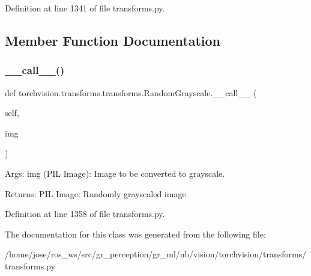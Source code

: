 Definition at line 1341 of file transforms.\+py.



\subsection{Member Function Documentation}
\mbox{\label{classtorchvision_1_1transforms_1_1transforms_1_1RandomGrayscale_aa02b86308d282e359f0cfb294fbb53ba}} 
\subsubsection{\texorpdfstring{\+\_\+\+\_\+call\+\_\+\+\_\+()}{\_\_call\_\_()}}
{\footnotesize\ttfamily def torchvision.\+transforms.\+transforms.\+Random\+Grayscale.\+\_\+\+\_\+call\+\_\+\+\_\+ (\begin{DoxyParamCaption}\item[{}]{self,  }\item[{}]{img }\end{DoxyParamCaption})}

\begin{DoxyVerb}Args:
    img (PIL Image): Image to be converted to grayscale.

Returns:
    PIL Image: Randomly grayscaled image.
\end{DoxyVerb}
 

Definition at line 1358 of file transforms.\+py.



The documentation for this class was generated from the following file\+:\begin{DoxyCompactItemize}
\item 
/home/jose/ros\+\_\+ws/src/gr\+\_\+perception/gr\+\_\+ml/nb/vision/torchvision/transforms/transforms.\+py\end{DoxyCompactItemize}

